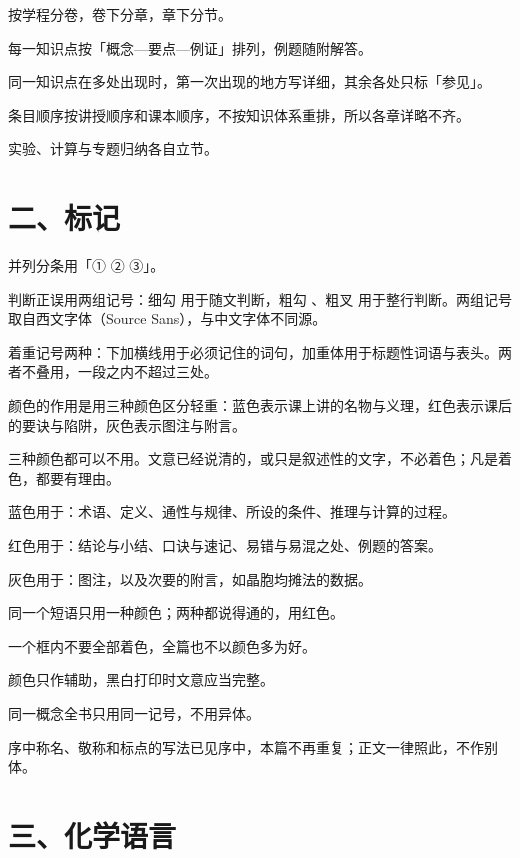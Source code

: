 \begin{fanli}
  \item 按学程分卷，卷下分章，章下分节。
  \item 每一知识点按「概念—要点—例证」排列，例题随附解答。
  \item 同一知识点在多处出现时，第一次出现的地方写详细，其余各处只标「参见」。
  \item 条目顺序按讲授顺序和课本顺序，不按知识体系重排，所以各章详略不齐。
  \item 实验、计算与专题归纳各自立节。
\end{fanli}

\section*{二、标记}

\begin{fanli}
  \item 并列分条用「① ② ③」。
  \item 判断正误用两组记号：细勾 \cmark{} 用于随文判断，粗勾 \hcmark{}、粗叉 \hxmark{} 用于整行判断。两组记号取自西文字体（Source Sans），与中文字体不同源。
  \item 着重记号两种：下加横线用于必须记住的词句，加重体用于标题性词语与表头。两者不叠用，一段之内不超过三处。
  \item 颜色的作用是用三种颜色区分轻重：蓝色表示课上讲的名物与义理，红色表示课后的要诀与陷阱，灰色表示图注与附言。
  \item 三种颜色都可以不用。文意已经说清的，或只是叙述性的文字，不必着色；凡是着色，都要有理由。
  \item 蓝色用于：术语、定义、通性与规律、所设的条件、推理与计算的过程。
  \item 红色用于：结论与小结、口诀与速记、易错与易混之处、例题的答案。
  \item 灰色用于：图注，以及次要的附言，如晶胞均摊法的数据。
  \item 同一个短语只用一种颜色；两种都说得通的，用红色。
  \item 一个框内不要全部着色，全篇也不以颜色多为好。
  \item 颜色只作辅助，黑白打印时文意应当完整。
  \item 同一概念全书只用同一记号，不用异体。
  \item 序中称名、敬称和标点的写法已见序中，本篇不再重复；正文一律照此，不作别体。
\end{fanli}

\section*{三、化学语言}


